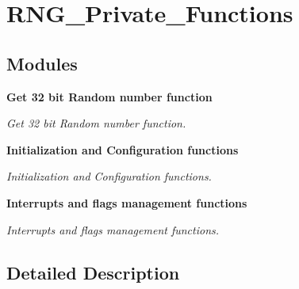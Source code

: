 \section{R\+N\+G\+\_\+\+Private\+\_\+\+Functions}
\label{group__RNG__Private__Functions}
\subsection*{Modules}
\begin{DoxyCompactItemize}
\item 
\textbf{ Get 32 bit Random number function}
\begin{DoxyCompactList}\small\item\em Get 32 bit Random number function. \end{DoxyCompactList}\item 
\textbf{ Initialization and Configuration functions}
\begin{DoxyCompactList}\small\item\em Initialization and Configuration functions. \end{DoxyCompactList}\item 
\textbf{ Interrupts and flags management functions}
\begin{DoxyCompactList}\small\item\em Interrupts and flags management functions. \end{DoxyCompactList}\end{DoxyCompactItemize}


\subsection{Detailed Description}
